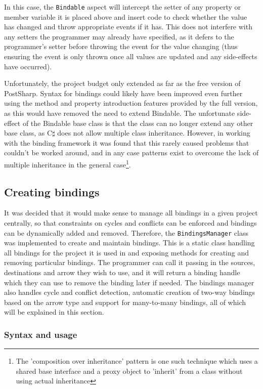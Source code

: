 \documentclass[12pt,twoside,notitlepage]{report}
\begin{document}
In this case, the \texttt{Bindable} aspect will intercept the setter of any property or member variable it is placed above and insert code to check whether the value has changed and throw appropriate events if it has. This does not interfere with any setters the programmer may already have specified, as it defers to the programmer's setter before throwing the event for the value changing (thus ensuring the event is only thrown once all values are updated and any side-effects have occurred).

Unfortunately, the project budget only extended as far as the free version of PostSharp. Syntax for bindings could likely have been improved even further using the method and property introduction features provided by the full version, as this would have removed the need to extend Bindable. The unfortunate side-effect of the Bindable base class is that the class can no longer extend any other base class, as C$\sharp$ does not allow multiple class inheritance. However, in working with the binding framework it was found that this rarely caused problems that couldn't be worked around, and in any case patterns exist to overcome the lack of multiple inheritance in the general case\footnote{The 'composition over inheritance' pattern is one such technique which uses a shared base interface and a proxy object to 'inherit' from a class without using actual inheritance}.

\subsection{Creating bindings}

It was decided that it would make sense to manage all bindings in a given project centrally, so that constraints on cycles and conflicts can be enforced and bindings can be dynamically added and removed. Therefore, the \texttt{BindingsManager} class was implemented to create and maintain bindings. This is a static class handling all bindings for the project it is used in and exposing methods for creating and removing particular bindings. The programmer can call it passing in the sources, destinations and arrow they wish to use, and it will return a binding handle which they can use to remove the binding later if needed. The bindings manager also handles cycle and conflict detection, automatic creation of two-way bindings based on the arrow type and support for many-to-many bindings, all of which will be explained in this section.

\subsubsection{Syntax and usage}
\end{document}

